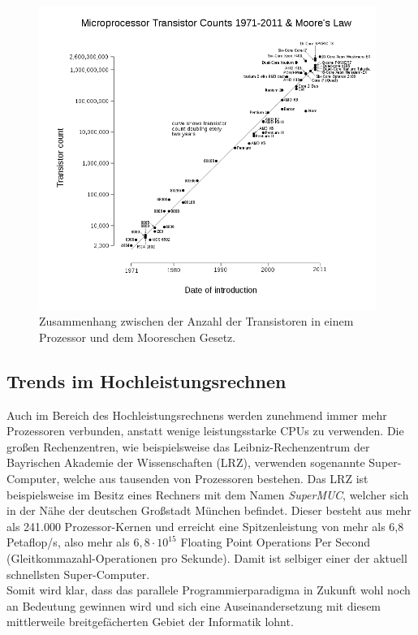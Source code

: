 			\begin{figure}
				\centering	
				\includegraphics[width=11cm]{Abbildungen/Moorsches_Gesetz.png}
				\caption{Zusammenhang zwischen der Anzahl der Transistoren in einem Prozessor und dem Mooreschen Gesetz.}
				\label{fig:MoorschesGesetz}
			\end{figure}
		
		\subsection{Trends im Hochleistungsrechnen}
		
			Auch im Bereich des Hochleistungsrechnens werden zunehmend immer mehr Prozessoren verbunden, anstatt wenige leistungsstarke CPUs zu verwenden. Die großen Rechenzentren, wie beispielsweise das Leibniz-Rechenzentrum der Bayrischen Akademie der Wissenschaften (LRZ), verwenden sogenannte Super-Computer, welche aus tausenden von Prozessoren bestehen. Das LRZ ist beispielsweise im Besitz eines Rechners mit dem Namen \textit{SuperMUC}, welcher sich in der Nähe der deutschen Großstadt München befindet. Dieser besteht aus mehr als 241.000 Prozessor-Kernen und erreicht eine Spitzenleistung von mehr als 6,8 Petaflop/s, also mehr als $6,8\cdot10^{15}$ Floating Point Operations Per Second (Gleitkommazahl-Operationen pro Sekunde). Damit ist selbiger einer der aktuell schnellsten Super-Computer. \cite{LRZ}\\
			Somit wird klar, dass das parallele Programmierparadigma in Zukunft wohl noch an Bedeutung gewinnen wird und sich eine Auseinandersetzung mit diesem mittlerweile breitgefächerten Gebiet der Informatik lohnt.